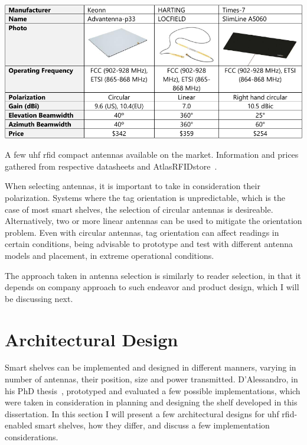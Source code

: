 \begin{table}
    \centering
    \includegraphics[width=\linewidth]{./figs/02-state-of-the-art/table_antennas.pdf}
    \caption[A few \ac{uhf} \ac{rfid} compact antennas available on the market]{A few \ac{uhf} \ac{rfid} compact antennas available on the market. Information and prices gathered from respective datasheets and AtlasRFIDstore~\cite{AtlasRFIDstoreBuyRFID}.}
    \label{tab:antennasolutions}
\end{table}

When selecting antennas, it is important to take in consideration their polarization. Systems where the tag orientation is unpredictable, which is the case of most smart shelves, the selection of circular antennas is desireable. Alternatively, two or more linear antennas can be used to mitigate the orientation problem.
Even with circular antennas, tag orientation can affect readings in certain conditions, being advisable to prototype and test with different antenna models and placement, in extreme operational conditions.

The approach taken in antenna selection is similarly to reader selection, in that it depends on company approach to such endeavor and product design, which I will be discussing next.

\section{Architectural Design}

Smart shelves can be implemented and designed in different manners, varying in number of antennas, their position, size and power transmitted.
D’Alessandro, in his PhD thesis~\cite{dalessandroRFIDBasedSmartShelving2012}, prototyped and evaluated a few possible implementations, which were taken in consideration in planning and designing the shelf developed in this dissertation.
In this section I will present a few architectural designs for \ac{uhf} \ac{rfid}-enabled smart shelves, how they differ, and discuss a few implementation considerations.

